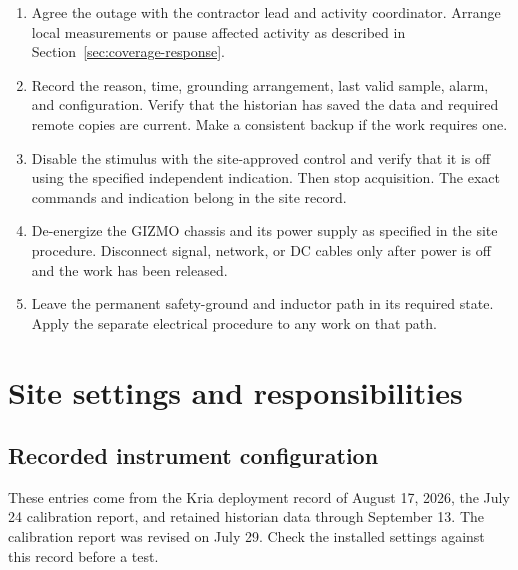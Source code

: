\documentclass[11pt]{article}
\begin{document}
\begin{enumerate}
  \item Agree the outage with the contractor lead and activity coordinator. Arrange local measurements or pause affected activity as described in Section~\ref{sec:coverage-response}.
  \item Record the reason, time, grounding arrangement, last valid sample, alarm, and configuration. Verify that the historian has saved the data and required remote copies are current. Make a consistent backup if the work requires one.
  \item Disable the stimulus with the site-approved control and verify that it is off using the specified independent indication. Then stop acquisition. The exact commands and indication belong in the site record.
  \item De-energize the GIZMO chassis and its power supply as specified in the site procedure. Disconnect signal, network, or DC cables only after power is off and the work has been released.
  \item Leave the permanent safety-ground and inductor path in its required state. Apply the separate electrical procedure to any work on that path.
\end{enumerate}

\section{Site settings and responsibilities}
\label{sec:site-record}

\subsection{Recorded instrument configuration}

These entries come from the Kria deployment record of August 17, 2026, the July 24 calibration report, and retained historian data through September 13. The calibration report was revised on July 29. Check the installed settings against this record before a test.
\end{document}
